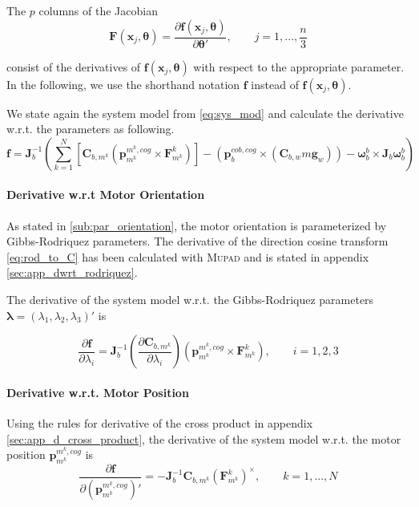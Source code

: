 The $p$ columns of the Jacobian
\begin{equation}
\mathbf{F}(\mathbf{x}_j, \boldsymbol{\theta}) = 
\frac{\partial \mathbf{f}(\mathbf{x}_j, \boldsymbol{\theta})} {\partial \boldsymbol{\theta}'}
, \qquad j=1,...,\frac{n}{3}
\end{equation}

consist of the derivatives of $\mathbf{f}(\mathbf{x}_j, \boldsymbol{\theta})$
with respect to the appropriate parameter.
In the following, we use the shorthand notation $\mathbf{f}$
instead of $\mathbf{f}(\mathbf{x}_j, \boldsymbol{\theta})$.

We state again the system model from \cref{eq:sys_mod} and calculate the derivative w.r.t. the parameters as following.
\begin{equation*}
\mathbf{f}
= \mathbf{J}_b^{-1} \left( 
\sum_{k=1}^N  \left[  \mathbf{C}_{b,m^k} \left( \mathbf{p}^{m^k,cog}_{m^k} \times \mathbf{F}^k_{m^k} \right)  \right]
-
\left( \mathbf{p}^{cob,cog}_b \times (\mathbf{C}_{b,w}m\mathbf{g}_w) \right)
- \boldsymbol{\omega}_b^b \times \mathbf{J}_b \boldsymbol{\omega}_b^b \right)
\end{equation*}


\paragraph{Derivative w.r.t Motor Orientation\\}
As stated in \cref{sub:par_orientation}, the motor orientation is parameterized by Gibbs-Rodriquez parameters. The derivative of the direction cosine transform \cref{eq:rod_to_C} has been calculated with \textsc{Mupad} and is stated in appendix \ref{sec:app_dwrt_rodriquez}.

The derivative of the system model w.r.t. the Gibbs-Rodriquez parameters $\boldsymbol{\lambda} = (\lambda_1, \lambda_2, \lambda_3)'$ is

\begin{equation}
\frac{\partial \mathbf{f}}{\partial \lambda_i} =
\mathbf{J}_b^{-1} 
\left( \frac{\partial \mathbf{C}_{b,m^k}}{\partial \lambda_i} \right)
\left( \mathbf{p}^{m^k,cog}_{m^k} \times \mathbf{F}^k_{m^k} \right)
, \qquad i = 1,2,3
\end{equation}

\paragraph{Derivative w.r.t. Motor Position\\}
Using the rules for derivative of the cross product in appendix \ref{sec:app_d_cross_product}, the derivative of the system model w.r.t. the motor position $\mathbf{p}^{m^k,cog}_{m^k}$ is
\begin{equation}
\frac{\partial \mathbf{f}}{\partial (\mathbf{p}^{m^k,cog}_{m^k})'} =
- \mathbf{J}_b^{-1} 
\mathbf{C}_{b,m^k}
\left( \mathbf{F}^k_{m^k} \right) ^\times
, \qquad k = 1,...,N
\end{equation}

